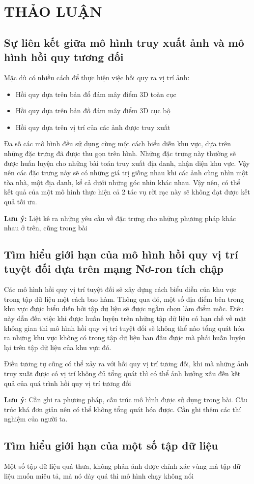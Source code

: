 \chapter{THẢO LUẬN}
\section{Sự liên kết giữa mô hình truy xuất ảnh và mô hình hồi quy tương đối}
Mặc dù có nhiều cách để thực hiện việc hồi quy ra vị trí ảnh:
\begin{itemize}
    \item Hồi quy dựa trên bản đổ đám mây điểm 3D toàn cục
    \item Hồi quy dựa trên bản đồ đám mây điểm 3D cục bộ
    \item Hồi quy dựa trên vị trí của các ảnh được truy xuất
\end{itemize}
Đa số các mô hình đều sử dụng cùng một cách biểu diễn khu vực, dựa trên những đặc trưng đã được thu gọn trên hình. Những đặc trưng này thường sẽ được huấn luyện cho những bài toán truy xuất địa danh, nhận diện khu vực. Vậy nên các đặc trưng này sẽ có những giá trị giống nhau khi các ảnh cùng nhìn một tòa nhà, một địa danh, kể cả dưới những góc nhìn khác nhau. Vậy nên, có thể kết quả của một mô hình thực hiện cả 2 tác vụ rời rạc này sẽ không đạt được kết quả tối ưu.\cite{pion2020benchmarking}

\textbf{Lưu ý:} Liệt kê ra những yêu cầu về đặc trưng cho những phương pháp khác nhau ở trên, cũng trong bài \cite{pion2020benchmarking}
\section{Tìm hiểu giới hạn của mô hình hồi quy vị trí tuyệt đối dựa trên mạng Nơ-ron tích chập}
Các mô hình hồi quy vị trí tuyệt đối sẽ xây dựng cách biểu diễn của khu vực trong tập dữ liệu một cách bao hàm. Thông qua đó, một số địa điểm bên trong khu vực được biểu diễn bởi tập dữ liệu sẽ được ngầm chọn làm điểm mốc. Điều này dẫn đến việc khi được huấn luyện trên những tập dữ liệu có hạn chế về mặt không gian thì mô hình hồi quy vị trí tuyệt đối sẽ không thể nào tổng quát hóa ra những khu vực không có trong tập dữ liệu ban đầu được mà phải huấn luyện lại trên tập dữ liệu của khu vực đó.\cite{sattler2019understanding}

Điều tương tự cũng có thể xảy ra với hồi quy vị trí tương đối, khi mà những ảnh truy xuất được có vị trí không đủ tổng quát thì có thể ảnh hưởng xấu đến kết quả của quá trình hồi quy vị trí tương đối

\textbf{Lưu ý}: Cần ghi ra phương pháp, cấu trúc mô hình được sử dụng trong bài. Cấu trúc khá đơn giản nên có thể không tổng quát hóa được. Cần ghi thêm các thí nghiệm của người ta.

\section{Tìm hiểu giới hạn của một số tập dữ liệu}
Một số tập dữ liệu quá thưa, không phản ánh được chính xác vùng mà tập dữ liệu muốn miêu tả, mà nó dày quá thì mô hình chạy không nổi\cite{berton2022rethinking} 